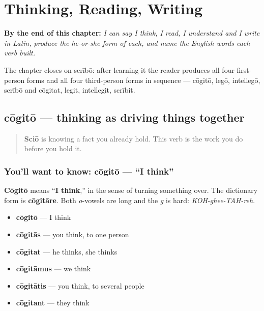 
\chapter{Thinking, Reading, Writing}
\label{ch:la-mind-verbs}

\begin{chapteropening}
\textbf{By the end of this chapter:} \emph{I can say I think, I read, I understand and I write in Latin, produce the he-or-she form of each, and name the English words each verb built.}

The chapter closes on scrībō: after learning it the reader produces all four first-person forms and all four third-person forms in sequence — cōgitō, legō, intellegō, scrībō and cōgitat, legit, intellegit, scrībit.
\end{chapteropening}

\section[cōgitō, cōgitāre]{cōgitō — thinking as driving things together}

\label{lesson:LA-C38-cogito}



\begin{quote}
\textbf{Sciō} is knowing a fact you already hold. This verb is the work you do before you hold it.
\end{quote}

\subsection*{You'll want to know: cōgitō — \textquotedblleft{}I think\textquotedblright{}}
\textbf{Cōgitō} means \textquotedblleft{}\textbf{I think},\textquotedblright{} in the sense of turning something over. The dictionary form is \textbf{cōgitāre}. Both \emph{o}-vowels are long and the \emph{g} is hard: \emph{KOH-ghee-TAH-reh}.

\begin{itemize}
\raggedright
  \item \textbf{cōgitō} — I think
  \item \textbf{cōgitās} — you think, to one person
  \item \textbf{cōgitat} — he thinks, she thinks
  \item \textbf{cōgitāmus} — we think
  \item \textbf{cōgitātis} — you think, to several people
  \item \textbf{cōgitant} — they think
\end{itemize}

